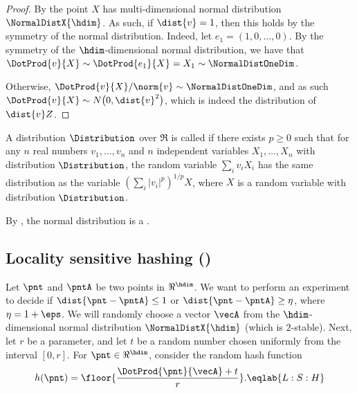 \begin{proof}
    By  the point $X$ has
    multi-dimensional normal distribution $\NormalDistX{\hdim}$.  As
    such, if $\dist{v}=1$, then this holds by the symmetry of the
    normal distribution. Indeed, let $e_1 = (1,0, \ldots, 0)$. By the
    symmetry of the $\hdim$-dimensional normal distribution, we have
    that $\DotProd{v}{ X} \sim \DotProd{e_1}{ X} = X_1 \sim
    \NormalDistOneDim$.

    Otherwise, $\DotProd{v}{ X} /\norm{v} \sim \NormalDistOneDim$, and
    as such $\DotProd{v}{X} \sim N\bigl( 0, \dist{v}^2 \bigr)$, which
    is indeed the distribution of $\dist{v} Z$.
\end{proof}


\begin{defn}
    A distribution $\Distribution$ over $\Re$ is called
     if there exists $p
    \ge 0$ such that for any $n$ real numbers $v_1, \ldots, v_n$ and
    $n$ independent variables $X_1, \ldots, X_n$ with distribution
    $\Distribution$, the random variable $\sum_i v_i X_i$ has the same
    distribution as the variable $(\sum_i |v_i|^p)^{1/p} X$, where $X$
    is a random variable with distribution $\Distribution$.
\end{defn}


By , the normal distribution is a .




\subsection{Locality sensitive hashing (\LSH)}



Let $\pnt$ and $\pntA$ be two points in $\Re^\hdim$. We want to
perform an experiment to decide if $\dist{\pnt -\pntA } \leq 1$ or
$\dist{\pnt -\pntA } \geq \eta$, where $\eta = 1+\eps$. We will
randomly choose a vector $\vecA$ from the $\hdim$-dimensional normal
distribution $\NormalDistX{\hdim}$ (which is $2$-stable). Next, let
$r$ be a parameter, and let $t$ be a random number chosen uniformly
from the interval $[0,r]$. For $\pnt \in \Re^\hdim$, consider the
random hash function
\begin{equation}
    h(\pnt) = \floor{ \frac{\DotProd{\pnt}{\vecA} + t}{r}}. 
    \eqlab{L:S:H}
\end{equation}

